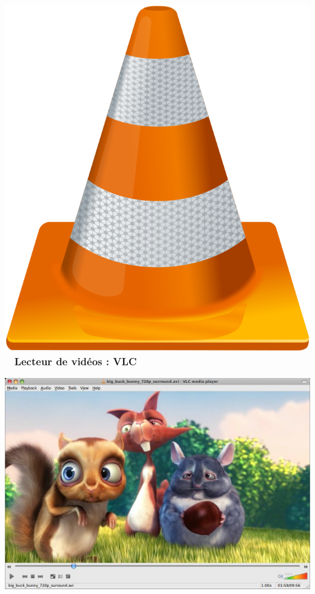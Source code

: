 \documentclass{beamer}
\begin{document}
\begin{frame}
\frametitle{\includegraphics[scale=0.05] {./images/vlc.png}  ~ Lecteur de vidéos : VLC}
\begin{center}
\includegraphics[scale=4] {./images/media-player-vlc-bunny.jpg} 
\end{center}
\end{frame}
\end{document}
